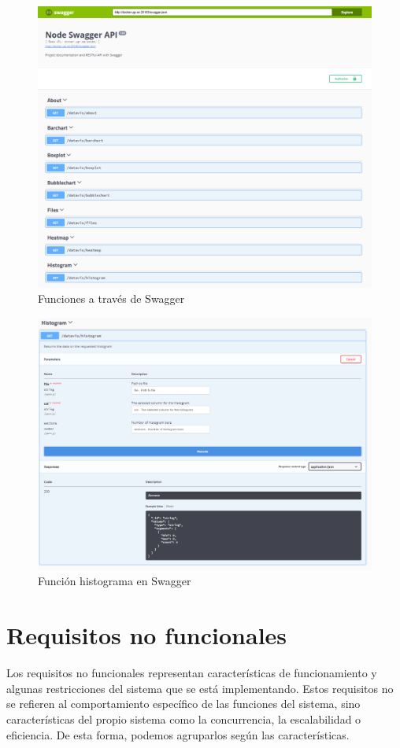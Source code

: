 \begin{figure}
	\centering
	\includegraphics[width=1\linewidth]{imagenes/swagger_funciones}
	\caption{Funciones a través de Swagger}
	\label{fig:swaggerfunciones}
\end{figure}
\begin{figure}
	\centering
	\includegraphics[width=1\linewidth]{imagenes/swagger_histograma}
	\caption{Función histograma en Swagger}
	\label{fig:swaggerhistograma}
\end{figure}

\section{Requisitos no funcionales}
Los requisitos no funcionales representan características de funcionamiento y algunas restricciones del sistema que se está implementando. Estos requisitos no se refieren al comportamiento específico de las funciones del sistema, sino características del propio sistema como la concurrencia, la escalabilidad o eficiencia. De esta forma, podemos agruparlos según las características.

